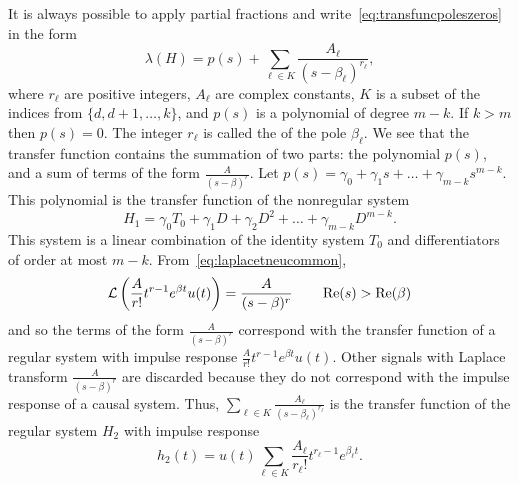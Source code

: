 It is always possible to apply partial fractions and write~\eqref{eq:transfuncpoleszeros} in the form
\[
\lambda(H) = p(s) + \sum_{\ell \in K} \frac{A_\ell}{(s - \beta_\ell)^{r_\ell}},
\]
where $r_\ell$ are positive integers, $A_\ell$ are complex constants, $K$ is a subset of the indices from $\{d,d+1,\dots,k\}$, and $p(s)$ is a polynomial of degree $m-k$.  If $k > m$ then $p(s) = 0$.  The integer $r_\ell$ is called the  of the pole $\beta_\ell$.  %
We see that the transfer function contains the summation of two parts: the polynomial $p(s)$, and a sum of terms of the form $\frac{A}{(s-\beta)^r}$.  Let $p(s) = \gamma_0 + \gamma_1 s + \dots + \gamma_{m-k}s^{m-k}$.  This polynomial is the transfer function of the nonregular system
\[
H_1 = \gamma_0 T_0 + \gamma_1 D + \gamma_2 D^2 + \dots + \gamma_{m-k} D^{m-k}.
\]
This system is a linear combination of the identity system $T_0$ and differentiators of order at most $m-k$.  From~\eqref{eq:laplacetneucommon},
\[
\mathcal L\left( \frac{A}{r!} t^{r-1} e^{\beta t} u(t) \right) = \frac{A}{(s-\beta)^{r}} \qquad \operatorname{Re}(s) > \operatorname{Re}(\beta)
\]
and so the terms of the form $\frac{A}{(s-\beta)^r}$ correspond with the transfer function of a regular system with impulse response $\frac{A}{r!} t^{r-1} e^{\beta t} u(t)$.  Other signals with Laplace transform $\frac{A}{(s-\beta)^{r}}$ are discarded because they do not correspond with the impulse response of a causal system.  Thus, $\sum_{\ell \in K} \frac{A_\ell}{(s - \beta_\ell)^{r_\ell}}$ is the transfer function of the regular system $H_2$ with impulse response 
\begin{equation}\label{eq:H2implrespcleanedup}
h_2(t) = u(t) \sum_{\ell\in K} \frac{A_\ell}{r_\ell!} t^{r_\ell-1} e^{\beta_\ell t}.
\end{equation}
